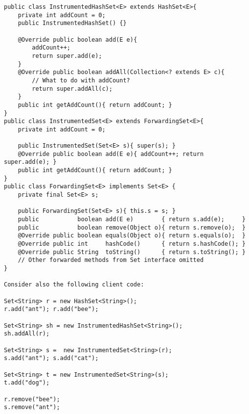 \documentclass[11pt]{article}
\begin{document}
\begin{verbatim}
public class InstrumentedHashSet<E> extends HashSet<E>{
    private int addCount = 0;	
    public InstrumentedHashSet() {}

    @Override public boolean add(E e){ 
        addCount++; 
        return super.add(e); 
    }
    @Override public boolean addAll(Collection<? extends E> c){ 
        // What to do with addCount?
        return super.addAll(c); 
    }
    public int getAddCount(){ return addCount; }
}
public class InstrumentedSet<E> extends ForwardingSet<E>{
    private int addCount = 0;	

    public InstrumentedSet(Set<E> s){ super(s); }
    @Override public boolean add(E e){ addCount++; return super.add(e); }
    public int getAddCount(){ return addCount; }
}
public class ForwardingSet<E> implements Set<E> {
    private final Set<E> s;

    public ForwardingSet(Set<E> s){ this.s = s; }
    public           boolean add(E e)        { return s.add(e);     }
    public           boolean remove(Object o){ return s.remove(o);  }
    @Override public boolean equals(Object o){ return s.equals(o);  }
    @Override public int     hashCode()      { return s.hashCode(); }
    @Override public String  toString()      { return s.toString(); }
    // Other forwarded methods from Set interface omitted
}

Consider also the following client code:

Set<String> r = new HashSet<String>();
r.add("ant"); r.add("bee");

Set<String> sh = new InstrumentedHashSet<String>();
sh.addAll(r);

Set<String> s =  new InstrumentedSet<String>(r);
s.add("ant"); s.add("cat");

Set<String> t = new InstrumentedSet<String>(s);
t.add("dog");

r.remove("bee");
s.remove("ant");
\end{verbatim}
\end{document}
